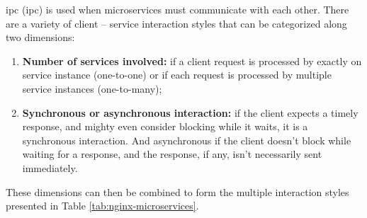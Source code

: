 \acrlong{ipc} (\acrshort{ipc}) is used when microservices must communicate with each other. There are a variety of client -- service interaction styles that can be categorized along two dimensions:

\begin{enumerate}
    \item \textbf{Number of services involved:} if a client request is processed by exactly on service instance (one-to-one) or if each request is processed by multiple service instances (one-to-many);
    \item \textbf{Synchronous or asynchronous interaction:} if the client expects a timely response, and mighty even consider blocking while it waits, it is a synchronous interaction. And asynchronous if the client doesn't block while waiting for a response, and the response, if any, isn't necessarily sent immediately.
\end{enumerate}

These dimensions can then be combined to form the multiple interaction styles presented in Table \ref{tab:nginx-microservices}.



